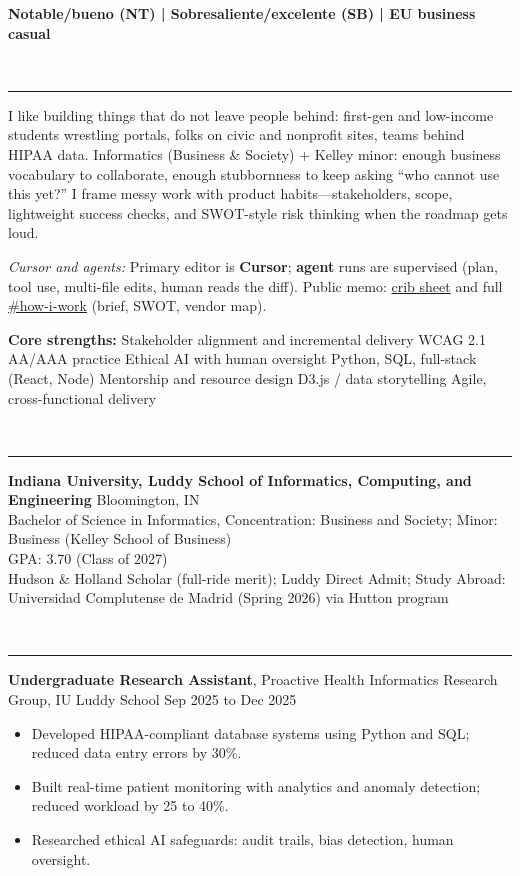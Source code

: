 \documentclass[11pt]{article}
\newcommand{\ressection}[1]{%
  \vspace{0.55em}%
  \noindent{\large\bfseries #1}\\[-0.15em]%
  \noindent\rule{\linewidth}{0.4pt}%
  \vspace{0.3em}%
}
\begin{document}

\vspace{0.25em}\newline\noindent\textbf{Notable/bueno (NT) \;|\; Sobresaliente/excelente (SB) \;|\; EU business casual}\n

\vspace{0.5em}

\ressection{Professional profile}
I like building things that do not leave people behind: first-gen and low-income students wrestling portals, folks on civic and nonprofit sites, teams behind HIPAA data. Informatics (Business \& Society) + Kelley minor: enough business vocabulary to collaborate, enough stubbornness to keep asking ``who cannot use this yet?'' I frame messy work with product habits---stakeholders, scope, lightweight success checks, and SWOT-style risk thinking when the roadmap gets loud.

\noindent\textit{Cursor and agents:} Primary editor is \textbf{Cursor}; \textbf{agent} runs are supervised (plan, tool use, multi-file edits, human reads the diff). Public memo: \href{https://matchaxmoxie.github.io/matchaxmoxie/\#cursor-and-agents}{crib sheet} and full \href{https://matchaxmoxie.github.io/matchaxmoxie/\#how-i-work}{\#how-i-work} (brief, SWOT, vendor map).

\noindent\textbf{Core strengths:}
Stakeholder alignment and incremental delivery \textbullet{}
WCAG 2.1 AA/AAA practice \textbullet{}
Ethical AI with human oversight \textbullet{}
Python, SQL, full-stack (React, Node) \textbullet{}
Mentorship and resource design \textbullet{}
D3.js / data storytelling \textbullet{}
Agile, cross-functional delivery

\ressection{Education}
\noindent\textbf{Indiana University, Luddy School of Informatics, Computing, and Engineering} \hfill Bloomington, IN\\
Bachelor of Science in Informatics, Concentration: Business and Society; Minor: Business (Kelley School of Business)\\
GPA: 3.70 (Class of 2027)\\
Hudson \& Holland Scholar (full-ride merit); Luddy Direct Admit; Study Abroad: Universidad Complutense de Madrid (Spring 2026) via Hutton program

\ressection{Experience}
\noindent\textbf{Undergraduate Research Assistant}, Proactive Health Informatics Research Group, IU Luddy School \hfill Sep 2025 to Dec 2025
\begin{itemize}
    \item Developed HIPAA-compliant database systems using Python and SQL; reduced data entry errors by 30\%.
    \item Built real-time patient monitoring with analytics and anomaly detection; reduced workload by 25 to 40\%.
    \item Researched ethical AI safeguards: audit trails, bias detection, human oversight.
\end{itemize}
\end{document}

